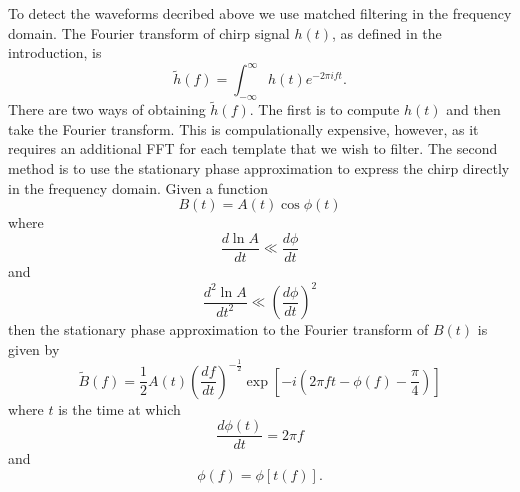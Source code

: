 To detect the waveforms decribed above we use matched filtering in the
frequency domain. The Fourier transform of chirp signal $h(t)$, as defined in
the introduction, is
\begin{equation}
\tilde{h}(f) = \int_{-\infty}^{\infty} h(t) e^{-2\pi i f t}.
\end{equation}
There are two ways of obtaining $\tilde{h}(f)$. The first is to compute $h(t)$
and then take the Fourier transform. This is compulationally expensive,
however, as it requires an additional FFT for each template that we wish to
filter. The second method is to use the stationary phase
approximation\cite{xxx} to express the chirp directly in the frequency
domain\cite{xxx}. Given a function
\begin{equation}
B(t) = A(t) \cos \phi(t)
\end{equation}
where
\begin{equation}
\frac{d\ln A}{dt} \ll \frac{d\phi}{dt}
\end{equation}
and
\begin{equation}
\frac{d^2\ln A}{dt^2} \ll \left(\frac{d\phi}{dt}\right)^2
\end{equation}
then the stationary phase approximation to the Fourier transform of $B(t)$ is
given by
\begin{equation}
\tilde{B}(f) = \frac{1}{2} A(t) \left(\frac{df}{dt}\right)^{-\frac{1}{2}}
\exp\left[ -i \left(2\pi f t - \phi(f) - \frac{\pi}{4} \right)\right]
\end{equation}
where $t$ is the time at which
\begin{equation}
\frac{d\phi(t)}{dt} = 2\pi f
\end{equation}
and
\begin{equation}
\phi(f) = \phi\left[t(f)\right].
\end{equation}

